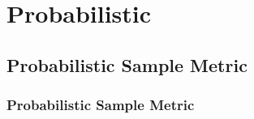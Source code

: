 \chapter{Probabilistic}


\clearpage
\thispagestyle{clusteringstyle}
\section{Probabilistic Sample Metric}
\subsection{Probabilistic Sample Metric}